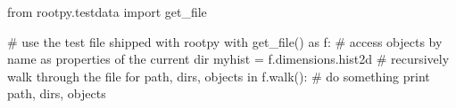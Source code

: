 \begin{footnotesize}
\begin{pyglist}[language=python,texcl=true,style=vs,bgcolor=Moccasin]
from rootpy.testdata import get_file

# use the test file shipped with rootpy
with get_file() as f:
    # access objects by name as properties of the current dir
    myhist = f.dimensions.hist2d
    # recursively walk through the file
    for path, dirs, objects in f.walk():
        # do something
        print path, dirs, objects
\end{pyglist}
\end{footnotesize}
